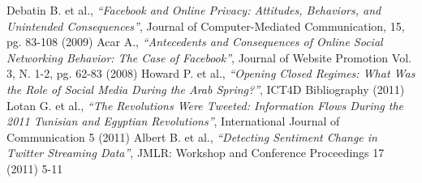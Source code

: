 \documentclass[a4paper]{article}
\begin{document}
\begin{thebibliography}{9}
Debatin B. et al., \emph{``Facebook and Online Privacy: Attitudes, Behaviors,
and Unintended Consequences''}, Journal of Computer-Mediated Communication,
15, pg. 83-108 (2009)
Acar A., \emph{``Antecedents and Consequences of Online Social Networking
Behavior: The Case of Facebook''}, Journal of Website Promotion Vol. 3, N.
1-2, pg. 62-83 (2008)
Howard P. et al., \emph{``Opening Closed Regimes: What Was the Role of Social Media
During the Arab Spring?''}, ICT4D Bibliography (2011)
Lotan G. et al., \emph{``The Revolutions Were Tweeted: Information Flows During
the 2011 Tunisian and Egyptian Revolutions''}, International Journal of
Communication 5 (2011)
Albert B. et al., \emph{``Detecting Sentiment Change in Twitter Streaming
	Data''}, JMLR: Workshop and Conference Proceedings 17 (2011) 5-11
\end{thebibliography}
\end{document}
